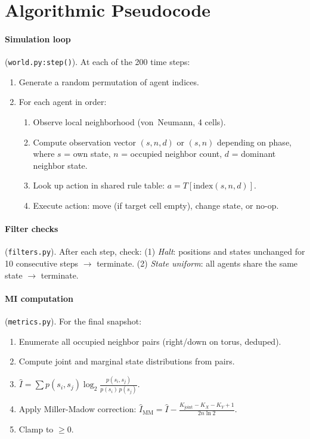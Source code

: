 \documentclass[letterpaper]{article}
\begin{document}
\section{Algorithmic Pseudocode}
\label{app:pseudocode}

\paragraph{Simulation loop} (\texttt{world.py:step()}).
At each of the 200 time steps:
\begin{enumerate}
  \item Generate a random permutation of agent indices.
  \item For each agent in order:
    \begin{enumerate}
      \item Observe local neighborhood (von~Neumann, 4 cells).
      \item Compute observation vector $(s, n, d)$ or $(s, n)$ depending on
            phase, where $s$ = own state, $n$ = occupied neighbor count,
            $d$ = dominant neighbor state.
      \item Look up action in shared rule table: $a = T[\mathrm{index}(s, n, d)]$.
      \item Execute action: move (if target cell empty), change state, or no-op.
    \end{enumerate}
\end{enumerate}

\paragraph{Filter checks} (\texttt{filters.py}).
After each step, check:
(1) \emph{Halt}: positions and states unchanged for 10 consecutive steps $\to$ terminate.
(2) \emph{State uniform}: all agents share the same state $\to$ terminate.

\paragraph{MI computation} (\texttt{metrics.py}).
For the final snapshot:
\begin{enumerate}
  \item Enumerate all occupied neighbor pairs (right/down on torus, deduped).
  \item Compute joint and marginal state distributions from pairs.
  \item $\hat{I} = \sum p(s_i, s_j) \log_2 \frac{p(s_i, s_j)}{p(s_i)\,p(s_j)}$.
  \item Apply Miller-Madow correction:
        $\hat{I}_{\mathrm{MM}} = \hat{I} - \frac{K_{\mathrm{joint}} - K_X - K_Y + 1}{2n\ln 2}$.
  \item Clamp to $\geq 0$.
\end{enumerate}
\end{document}
